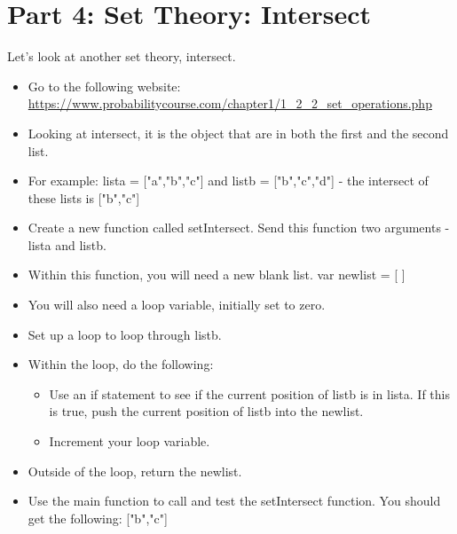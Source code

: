 \documentclass{article}
\begin{document}
\section*{Part 4: Set Theory: Intersect}
Let's look at another set theory, intersect.  
\begin{itemize}
    \item Go to the following website:  \url{https://www.probabilitycourse.com/chapter1/1_2_2_set_operations.php}
    \item Looking at intersect, it is the object that are in both the first and the second list.
    \item For example:  lista = ["a","b","c"] and listb = ["b","c","d"] - the intersect of these lists is ["b","c"]
    \item Create a new function called setIntersect.  Send this function two arguments - lista and listb.
    \item Within this function, you will need a new blank list.  var newlist = [ ]
    \item You will also need a loop variable, initially set to zero.
    \item Set up a loop to loop through listb.
    \item Within the loop, do the following:
    \begin{itemize}
    		\item Use an if statement to see if the current position of listb is in lista.  If this is true, push the current position of listb into the newlist.
    		\item Increment your loop variable.
    	\end{itemize}
    	\item Outside of the loop, return the newlist.
    	\item Use the main function to call and test the setIntersect function.  You should get the following:  ["b","c"]
\end{itemize}
\end{document}
